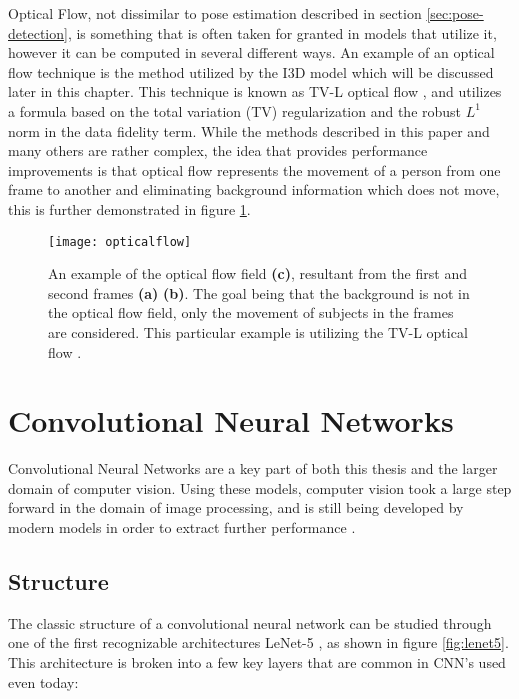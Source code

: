 Optical Flow, not dissimilar to pose estimation described in section \ref{sec:pose-detection}, is something that is often taken for granted in models that utilize it, however it can be computed in several different ways. An example of an optical flow technique is the method utilized by the I3D model \cite{i3d} which will be discussed later in this chapter. This technique is known as TV-L optical flow \cite{TV-L}, and utilizes a formula based on the total variation (TV) regularization and the robust $L^1$ norm in the data fidelity term. While the methods described in this paper and many others are rather complex, the idea that provides performance improvements is that optical flow represents the movement of a person from one frame to another and eliminating background information which does not move, this is further demonstrated in figure \ref{fig:opticalflow}.

\begin{figure}[ht]
	\texttt{[image: opticalflow]}
	\centering
	\caption{An example of the optical flow field \textbf{(c)}, resultant from the first and second frames \textbf{(a)} \textbf{(b)}. The goal being that the background is not in the optical flow field, only the movement of subjects in the frames are considered. This particular example is utilizing the TV-L optical flow \cite{TV-L}.}
	\label{fig:opticalflow}
\end{figure}


\section{Convolutional Neural Networks}

Convolutional Neural Networks are a key part of both this thesis and the larger domain of computer vision. Using these models, computer vision took a large step forward in the domain of image processing, and is still being developed by modern models in order to extract further performance \cite{deeplearning}.

\subsection{Structure}

The classic structure of a convolutional neural network can be studied through one of the first recognizable architectures LeNet-5 \cite{lenet5}, as shown in figure \ref{fig:lenet5}. This architecture is broken into a few key layers that are common in CNN's used even today:

